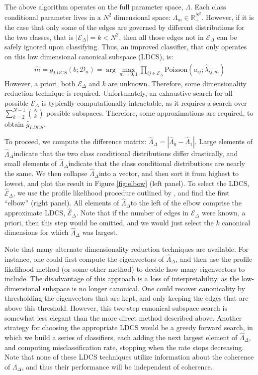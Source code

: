 \documentclass{article}
\newcommand{\mD}{\mathcal{D}}
\newcommand{\mE}{\mathcal{E}}
\newcommand{\hmE}{\widehat{\mathcal{E}}}
\newcommand{\hg}{\widehat{g}}
\newcommand{\hm}{\widehat{m}}
\newcommand{\Lam}{\Lambda}
\newcommand{\hlam}{\widehat{\lambda}}
\newcommand{\hLam}{\widehat{\Lambda}}
\newcommand{\Real}{\mathbb{R}}
\newcommand{\mED}{\mE_{\Delta}}
\newcommand{\hLD}{$\hLam_{\Delta}$}
\begin{document}
The above algorithm operates on the full parameter space, $\Lam$.  Each class conditional parameter lives in a $N^2$ dimensional space: $\Lam_m \in \Real_+^{N^2}$.  However, if it is the case that only some of the edges are governed by different distributions for the two classes, that is $|\mED|=k < N^2$, then all those edges not in $\mED$ can be safely ignored upon classifying.  Thus, an improved classifier, that only operates on this low dimensional canonical subspace (LDCS), is:
\begin{align}
	\hm = g_{LDCS}(b; \mD_n) = \arg \max_{m=0,1} \prod_{ij \in \mE_{\Delta}} \text{Poisson}(a_{ij}; \hlam_{ij,m})
\end{align}
However, a priori, both $\mED$ and $k$ are unknown.  Therefore, some dimensionality reduction technique is required. Unfortunately, an exhaustive search for all possible $\mED$ is typically computationally intractable, as it requires a search over $\sum_{k=2}^{N-1} \binom{N}{k}$ possible subspaces. Therefore, some approximations are required, to obtain $\hg_{LDCS}$.

To proceed, we compute the difference matrix: $\hLam_{\Delta}=|\hLam_0 - \hLam_1|$.  Large elements of \hLD indicate that the two class conditional distributions differ drastically, and small elements of \hLD indicate that the class conditional distributions are nearly the same.  We then collapse \hLD into a vector, and then sort it from highest to lowest, and plot the result in Figure \ref{fig:elbow} (left panel).  To select the LDCS, $\hmE_{\Delta}$, we use the profile likelihood procedure outlined by \cite{ZhuGhodsi06}, and find the first ``elbow'' (right panel).   All elements of \hLD to the left of the elbow comprise the approximate LDCS, $\hmE_{\Delta}$. Note that if the number of edges in $\mED$ were known, a priori, then this step would be omitted, and we would just select the $k$ canonical dimensions for which $\hLam_{\Delta}$ was largest. 

Note that many alternate dimensionality reduction techniques are available.  For instance, one could first compute the eigenvectors of \hLD, and then use the profile likelihood method (or some other method) to decide how many eigenvectors to include.  The disadvantage of this approach is a loss of interpretability, as the low-dimensional subspace is no longer canonical.  One could recover canonicality by thresholding the eigenvectors that are kept, and only keeping the edges that are above this threshold.  However, this two-step canonical subspace search is somewhat less elegant than the more direct method described above.  Another strategy for choosing the appropriate LDCS would be a greedy forward search, in which we build a series of classifiers, each adding the next largest element of \hLD, and computing misclassification rate, stopping when the rate stops decreasing.  Note that none of these LDCS techniques utilize information about the coherence of $\Lam_{\Delta}$, and thus their performance will be independent of coherence.  
\end{document}
